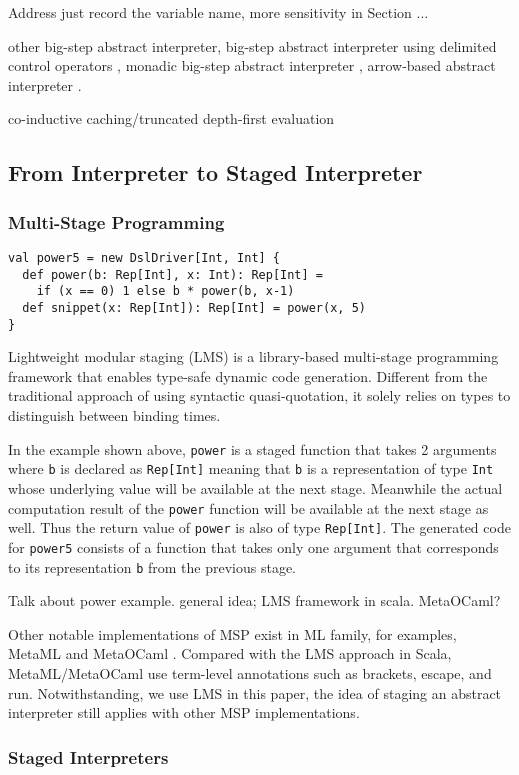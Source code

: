 Address just record the variable name, more sensitivity in Section ...

other big-step abstract interpreter, 
big-step abstract interpreter using delimited control operators \cite{Wei:2018:RAA:3243631.3236800},
monadic big-step abstract interpreter \cite{DBLP:journals/pacmpl/DaraisLNH17},
arrow-based abstract interpreter \cite{Keidel:2018:CSP:3243631.3236767}.

co-inductive caching/truncated depth-first evaluation \cite{DBLP:journals/pacmpl/DaraisLNH17, Wei:2018:RAA:3243631.3236800, Rosendahl:AbsIntPL}

\subsection{From Interpreter to Staged Interpreter} \label{stagedinterp}

\subsubsection{Multi-Stage Programming}
\begin{lstlisting}
val power5 = new DslDriver[Int, Int] {
  def power(b: Rep[Int], x: Int): Rep[Int] =
    if (x == 0) 1 else b * power(b, x-1)
  def snippet(x: Rep[Int]): Rep[Int] = power(x, 5)
}
\end{lstlisting}

Lightweight modular staging (LMS)  is a library-based multi-stage programming framework 
that enables type-safe dynamic code generation. Different from the traditional approach of using
syntactic quasi-quotation, it solely relies on types to distinguish between binding times.

In the example shown above, \texttt{power} is a staged function that takes 2 arguments where 
\texttt{b} is declared as \texttt{Rep[Int]} meaning that \texttt{b} is a representation of type 
\texttt{Int} whose underlying value will be available at the next stage. Meanwhile the actual 
computation result of the \texttt{power} function  will be available at the next stage as well. 
Thus the return value of \texttt{power} is also of type \texttt{Rep[Int]}. The generated code for
\texttt{power5} consists of a function that takes only one argument that corresponds to its 
representation \texttt{b} from the previous stage.

Talk about power example. general idea; LMS framework in scala. MetaOCaml?

Other notable implementations of MSP exist in ML family, for examples, MetaML \cite{DBLP:conf/pepm/TahaS97} 
and MetaOCaml \cite{DBLP:conf/gpce/CalcagnoTHL03, DBLP:conf/flops/Kiselyov14}.
Compared with the LMS approach in Scala, MetaML/MetaOCaml use term-level annotations such as brackets, 
escape, and run. Notwithstanding, we use LMS in this paper, the idea of staging an abstract interpreter
still applies with other MSP implementations.

\subsubsection{Staged Interpreters} 
